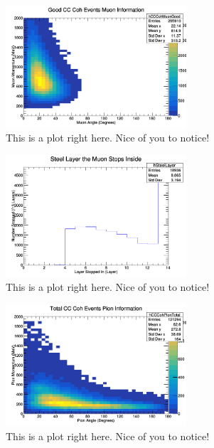 \documentclass[11pt]{article}
\begin{document}
\begin{figure}[H]
\centering
\includegraphics[width=0.6\textwidth]{NewANMReinSehgalImages/6-GoodCCCohMuonInfoANMRS.png}
\caption{This is a plot right here. Nice of you to notice!}
\end{figure}

\begin{figure}[H]
\centering
\includegraphics[width=0.6\textwidth]{NewANMReinSehgalImages/7-LayerPenetrationANMRS.png}
\caption{This is a plot right here. Nice of you to notice!}
\end{figure}

\begin{figure}[H]
\centering
\includegraphics[width=0.6\textwidth]{NewANMReinSehgalImages/8-TotalCCCohPionInfoANMRS.png}
\caption{This is a plot right here. Nice of you to notice!}
\end{figure}
\end{document}
